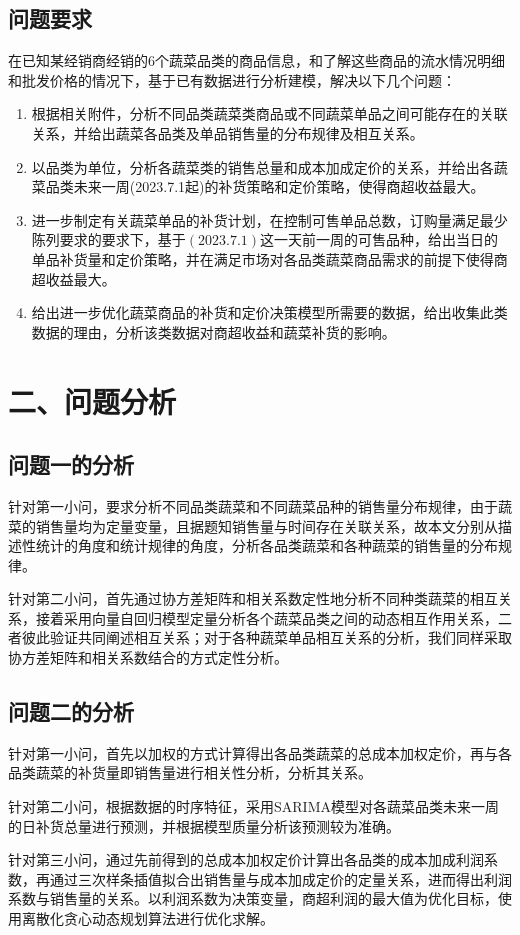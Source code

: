 \documentclass{my_paper}
\begin{document}
\subsection{问题要求}
在已知某经销商经销的$6$个蔬菜品类的商品信息，和了解这些商品的流水情况明细和批发价格的情况下，基于已有数据进行分析建模，解决以下几个问题：
\begin{enumerate}
    \item 根据相关附件，分析不同品类蔬菜类商品或不同蔬菜单品之间可能存在的关联关系，并给出蔬菜各品类及单品销售量的分布规律及相互关系。
    \item 以品类为单位，分析各蔬菜类的销售总量和成本加成定价的关系，并给出各蔬菜品类未来一周(2023.7.1起)的补货策略和定价策略，使得商超收益最大。
    \item 进一步制定有关蔬菜单品的补货计划，在控制可售单品总数，订购量满足最少陈列要求的要求下，基于$(2023.7.1)$这一天前一周的可售品种，给出当日的单品补货量和定价策略，并在满足市场对各品类蔬菜商品需求的前提下使得商超收益最大。
    \item 给出进一步优化蔬菜商品的补货和定价决策模型所需要的数据，给出收集此类数据的理由，分析该类数据对商超收益和蔬菜补货的影响。
\end{enumerate}
\section{二、问题分析}

\subsection{问题一的分析}
针对第一小问，要求分析不同品类蔬菜和不同蔬菜品种的销售量分布规律，由于蔬菜的销售量均为定量变量，且据题知销售量与时间存在关联关系，故本文分别从描述性统计的角度和统计规律的角度，分析各品类蔬菜和各种蔬菜的销售量的分布规律。\par
针对第二小问，首先通过协方差矩阵和相关系数定性地分析不同种类蔬菜的相互关系，接着采用向量自回归模型定量分析各个蔬菜品类之间的动态相互作用关系，二者彼此验证共同阐述相互关系；对于各种蔬菜单品相互关系的分析，我们同样采取协方差矩阵和相关系数结合的方式定性分析。
\subsection{问题二的分析}
针对第一小问，首先以加权的方式计算得出各品类蔬菜的总成本加权定价，再与各品类蔬菜的补货量即销售量进行相关性分析，分析其关系。\par
针对第二小问，根据数据的时序特征，采用SARIMA模型对各蔬菜品类未来一周的日补货总量进行预测，并根据模型质量分析该预测较为准确。\par
针对第三小问，通过先前得到的总成本加权定价计算出各品类的成本加成利润系数，再通过三次样条插值拟合出销售量与成本加成定价的定量关系，进而得出利润系数与销售量的关系。以利润系数为决策变量，商超利润的最大值为优化目标，使用离散化贪心动态规划算法进行优化求解。
\end{document}
